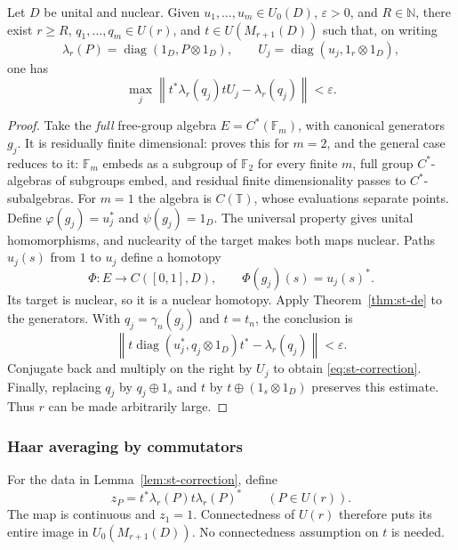 \begin{lemma}\label{lem:st-correction}
Let \(D\) be unital and nuclear. Given \(u_1,\ldots,u_m\in U_0(D)\),
\(\varepsilon>0\), and \(R\in\mathbb N\), there exist \(r\geq R\),
\(q_1,\ldots,q_m\in U(r)\), and \(t\in U(M_{r+1}(D))\) such that,
on writing
\[
 \lambda_r(P)=\operatorname{diag}(1_D,P\otimes1_D),\qquad
 U_j=\operatorname{diag}(u_j,1_r\otimes1_D),
\]
one has
\begin{equation}\label{eq:st-correction}
 \max_j\left\|t^*\lambda_r(q_j)tU_j-\lambda_r(q_j)\right\|<\varepsilon.
\end{equation}
\end{lemma}
\begin{proof}
Take the \emph{full} free-group algebra \(E=C^*(\mathbb F_m)\), with
canonical generators \(g_j\). It is residually finite dimensional:
\cite[Theorem~7]{Choi1980} proves this for \(m=2\), and the general case
reduces to it: \(\mathbb F_m\) embeds as a subgroup of \(\mathbb F_2\) for every finite
\(m\), full group $C^*$-algebras of subgroups embed, and residual finite
dimensionality passes to $C^*$-subalgebras. For \(m=1\) the algebra is
\(C(\mathbb T)\), whose evaluations separate points. Define
\(\varphi(g_j)=u_j^*\) and \(\psi(g_j)=1_D\).
The universal property gives unital homomorphisms, and nuclearity
of the target makes both maps nuclear. Paths \(u_j(s)\) from \(1\)
to \(u_j\) define a homotopy
\[
 \Phi:E\longrightarrow C([0,1],D),\qquad
 \Phi(g_j)(s)=u_j(s)^*.
\]
Its target is nuclear, so it is a nuclear homotopy.
Apply Theorem~\ref{thm:st-de} to the generators. With
\(q_j=\gamma_n(g_j)\) and \(t=t_n\), the conclusion is
\[
 \left\|t\operatorname{diag}(u_j^*,q_j\otimes1_D)t^*-\lambda_r(q_j)\right\|
 <\varepsilon.
\]
Conjugate back and multiply on the right by \(U_j\) to obtain
\eqref{eq:st-correction}. Finally, replacing \(q_j\) by \(q_j\oplus1_s\)
and \(t\) by \(t\oplus(1_s\otimes1_D)\) preserves this estimate.
Thus \(r\) can be made arbitrarily large.
\end{proof}


\subsubsection{Haar averaging by commutators}
For the data in Lemma~\ref{lem:st-correction}, define
\begin{equation}\label{eq:st-z}
 z_P=t^*\lambda_r(P)t\lambda_r(P)^*\qquad(P\in U(r)).
\end{equation}
The map is continuous and \(z_1=1\). Connectedness of \(U(r)\)
therefore puts its entire image in \(U_0(M_{r+1}(D))\).
No connectedness assumption on \(t\) is needed.


